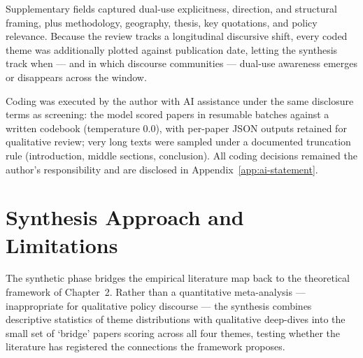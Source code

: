 Supplementary fields captured dual-use explicitness, direction, and structural framing, plus methodology, geography, thesis, key quotations, and policy relevance. Because the review tracks a longitudinal discursive shift, every coded theme was additionally plotted against publication date, letting the synthesis track when — and in which discourse communities — dual-use awareness emerges or disappears across the window.

Coding was executed by the author with AI assistance under the same disclosure terms as screening: the model scored papers in resumable batches against a written codebook (temperature 0.0), with per-paper JSON outputs retained for qualitative review; very long texts were sampled under a documented truncation rule (introduction, middle sections, conclusion). All coding decisions remained the author's responsibility and are disclosed in Appendix~\ref{app:ai-statement}.

\section{Synthesis Approach and Limitations}
\label{sec:limitations}

The synthetic phase bridges the empirical literature map back to the theoretical framework of Chapter~2. Rather than a quantitative meta-analysis — inappropriate for qualitative policy discourse — the synthesis combines descriptive statistics of theme distributions with qualitative deep-dives into the small set of `bridge' papers scoring across all four themes, testing whether the literature has registered the connections the framework proposes.

